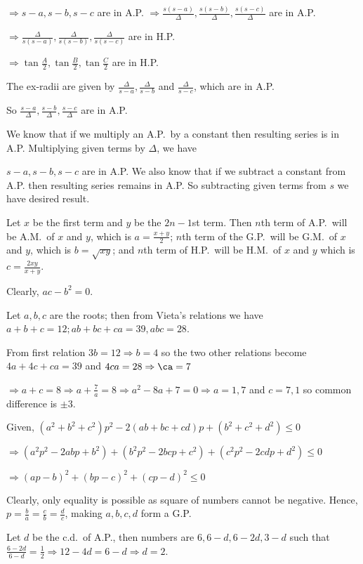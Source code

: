   $\Rightarrow s - a, s - b, s - c$ are in A.P. $\Rightarrow \frac{s(s - a)}{\Delta}, \frac{s(s -
    b)}{\Delta}, \frac{s(s - c)}{\Delta}$ are in A.P.

  $\Rightarrow \frac{\Delta}{s(s - a)}, \frac{\Delta}{s(s - b)}, \frac{\Delta}{s(s - c)}$ are in H.P.

  $\Rightarrow \tan\frac{A}{2}, \tan\frac{B}{2}, \tan\frac{C}{2}$ are in H.P.
\item The ex-radii are given by $\frac{\Delta}{s - a}, \frac{\Delta}{s - b}$ and $\frac{\Delta}{s - c}$,
  which are in A.P.

  So $\frac{s - a}{\Delta}, \frac{s - b}{\Delta}, \frac{s - c}{\Delta}$ are in A.P.

  We know that if we multiply an A.P.\ by a constant then resulting series is in A.P. Multiplying given
  terms by $\Delta$, we have

  $s - a, s - b, s - c$ are in A.P. We also know that if we subtract a constant from A.P. then resulting
  series remains in A.P. So subtracting given terms from $s$ we have desired result.
\item Let $x$ be the first term and $y$ be the $2n - 1$st term. Then $n$th term of A.P.\ will be A.M.\ of
  $x$ and $y$, which is $a = \frac{x + y}{2}$; $n$th term of the G.P.\ will be G.M.\ of $x$ and $y$, which
  is $b = \sqrt{xy}$; and $n$th term of H.P.\ will be H.M.\ of $x$ and $y$ which is $c = \frac{2xy}{x + y}$.

  Clearly, $ac - b^2 = 0$.
\item Let $a, b, c$ are the roots; then from Vieta's relations we have $a + b + c = 12; ab + bc + ca = 39,
  abc = 28$.

  From first relation $3b = 12 \Rightarrow b = 4$ so the two other relations become $4a + 4c + ca = 39$ and
  $4ca = 28 \Rightarrow \ca = 7$

  $\Rightarrow a + c = 8 \Rightarrow a + \frac{7}{a} = 8 \Rightarrow a^2 - 8a + 7 = 0 \Rightarrow a = 1, 7$
  and $c = 7, 1$ so common difference is $\pm 3$.
\item Given, $(a^2 + b^2 + c^2)p^2 - 2(ab + bc + cd)p + (b^2 + c^2 + d^2)\leq 0$

  $\Rightarrow (a^2p^2 - 2abp + b^2) + (b^2p^2 - 2bcp + c^2) + (c^2p^2 - 2cdp + d^2)\leq 0$

  $\Rightarrow (ap - b)^2 + (bp - c)^2 + (cp - d)^2\leq 0$

  Clearly, only equality is possible as square of numbers cannot be negative. Hence, $p = \frac{b}{a}
  = \frac{c}{b} = \frac{d}{c}$, making $a, b, c, d$ form a G.P.
\item Let $d$ be the c.d.\ of A.P., then numbers are $6, 6 - d, 6 -2d, 3 - d$ such that $\frac{6 - 2d}{6 -
  d} = \frac{1}{2} \Rightarrow 12 - 4d = 6 - d \Rightarrow d = 2$.

